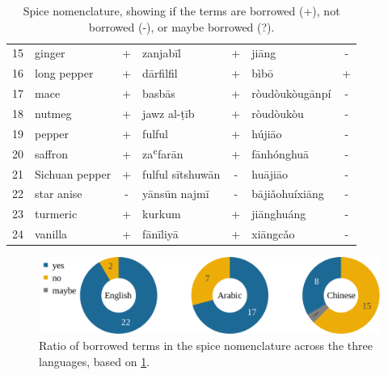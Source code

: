 \begin{table}[ht]
\begin{tabular}{@{}rlclclc@{}}
    15          & ginger           & +           & zanjabīl         & +           & jiāng            & -           \\
    16          & long pepper      & +           & dārfilfil        & +           & bìbō             & +           \\
    17          & mace             & +           & basbās           & +           & ròudòukòugānpí   & -           \\
    18          & nutmeg           & +           & jawz al-ṭīb      & +           & ròudòukòu        & -           \\
    19          & pepper           & +           & fulful           & +           & hújiāo           & -           \\
    20          & saffron          & +           & zaʿfarān         & +           & fānhónghuā       & -           \\
    21          & Sichuan pepper   & +           & fulful sītshuwān & -           & huā​jiāo         & -           \\
    22          & star anise       & -           & yānsūn najmī     & -           & bājiǎohuíxiāng   & -           \\
    23          & turmeric         & +           & kurkum           & +           & jiānghuáng       & -           \\
    24          & vanilla          & +           & fānīliyā         & +           & xiāngcǎo         & -           \\ \bottomrule
    \end{tabular}
    \caption[Spice nomenclature, showing if the terms are borrowed or not.]{Spice nomenclature, showing if the terms are borrowed (+), not borrowed (-), or maybe borrowed (?).}
    \label{table:borrowings}
    \end{table}


\begin{figure}[ht!]
  \includegraphics[width=\linewidth]{imgs/plots/borrowing_pie.pdf}
  \caption[{Ratio of borrowed and not borrowed terms in the spice nomenclature.}]{Ratio of borrowed terms in the spice nomenclature across the three languages, based on \cref{table:borrowings}.}
  \label{fig:borrowing_pie}
\end{figure}

